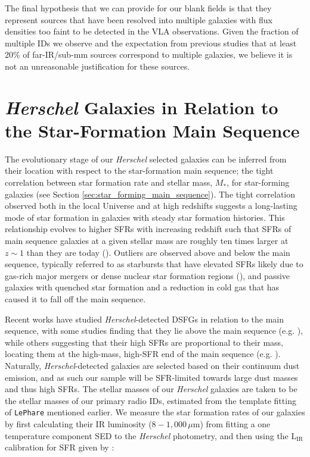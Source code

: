 The final hypothesis that we can provide for our blank fields is that they represent sources that have been resolved into multiple galaxies with flux densities too faint to be detected in the VLA observations. Given the fraction of multiple IDs we observe and the expectation from previous studies that at least 20\% of far-IR/sub-mm sources correspond to multiple galaxies, we believe it is not an unreasonable justification for these sources.

\section{\textit{Herschel} Galaxies in Relation to the Star-Formation Main Sequence}

The evolutionary stage of our \textit{Herschel} selected galaxies can be inferred from their location with respect to the star-formation main sequence; the tight correlation between star formation rate and stellar mass, $M_*$, for star-forming galaxies (see Section \ref{sec:star_forming_main_sequence}). The tight correlation observed both in the local Universe and at high redshifts suggests a long-lasting mode of star formation in galaxies with steady star formation histories. This relationship evolves to higher SFRs with increasing redshift such that SFRs of main sequence galaxies at a given stellar mass are roughly ten times larger at $z\sim1$ than they are today (\citealt{Noeske_2007}). Outliers are observed above and below the main sequence, typically referred to as starbursts that have elevated SFRs likely due to gas-rich major mergers or dense nuclear star formation regions (\citealt{Daddi_2010}), and passive galaxies with quenched star formation and a reduction in cold gas that has caused it to fall off the main sequence.

Recent works have studied \textit{Herschel}-detected DSFGs in relation to the main sequence, with some studies finding that they lie above the main sequence (e.g. \citealt{Hainline_2011}), while others suggesting that their high SFRs are proportional to their mass, locating them at the high-mass, high-SFR end of the main sequence (e.g. \citealt{Michalowski_2012a}). Naturally, \textit{Herschel}-detected galaxies are selected based on their continuum dust emission, and as such our sample will be SFR-limited towards large dust masses and thus high SFRs. The stellar masses of our \textit{Herschel} galaxies are taken to be the stellar masses of our primary radio IDs, estimated from the template fitting of \texttt{LePhare} mentioned earlier. We measure the star formation rates of our galaxies by first calculating their IR luminosity ($8 - 1,000\,\mu$m) from fitting a one temperature component SED to the \textit{Herschel} photometry, and then using the $\textrm{L}_{\textrm{IR}}$ calibration for SFR given by \citealt{Murphy_2011}:

